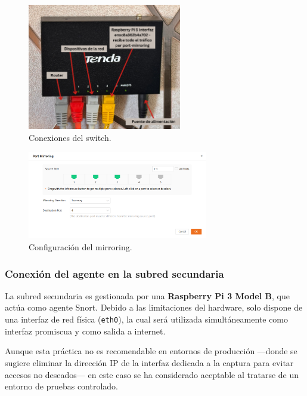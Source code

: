 \documentclass[11pt,a4paper,twoside]{report}
\begin{document}
\begin{figure}[H]
	\centering
	\includegraphics[width=0.6\textwidth]{install/0.2.png}
	\caption{Conexiones del switch.}
	\label{fig:switch-conexiones}
\end{figure}

\begin{figure}[H]
	\centering
	\includegraphics[width=0.70\textwidth]{install/9-asignacion_port.png}
	\caption{Configuración del mirroring.}
	\label{fig:switch-mirroring}
\end{figure}


\subsubsection{Conexión del agente en la subred secundaria}

La subred secundaria es gestionada por una \textbf{Raspberry Pi 3 Model B}, que actúa como agente Snort. Debido a las limitaciones del hardware, solo dispone de una interfaz de red física (\texttt{eth0}), la cual será utilizada simultáneamente como interfaz promiscua y como salida a internet.\newline

Aunque esta práctica no es recomendable en entornos de producción —donde se sugiere eliminar la dirección IP de la interfaz dedicada a la captura para evitar accesos no deseados— en este caso se ha considerado aceptable al tratarse de un entorno de pruebas controlado.\newline
\end{document}
